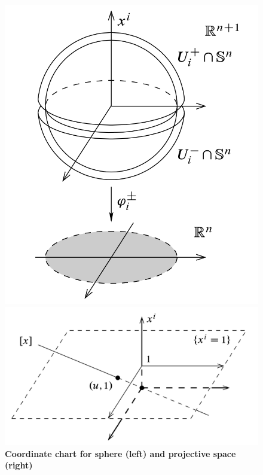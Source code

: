 \documentclass[11pt]{article}
\begin{document}
\begin{itemize}
\begin{figure}
\begin{minipage}[t]{0.5\linewidth}
  \centering
  \centerline{\includegraphics[scale = 0.4]{chart_sphere.png}}
\end{minipage}
\begin{minipage}[t]{0.5\linewidth}
  \centering
  \centerline{\includegraphics[scale = 0.4]{chart_projective.png}}
\end{minipage}
\caption{\footnotesize{\textbf{Coordinate chart for sphere (left) and projective space (right) \citep{lee2003introduction}}}}
\label{fig: coordinate_chart_sphere_projective}
\end{figure}


\end{itemize}
\end{document}
